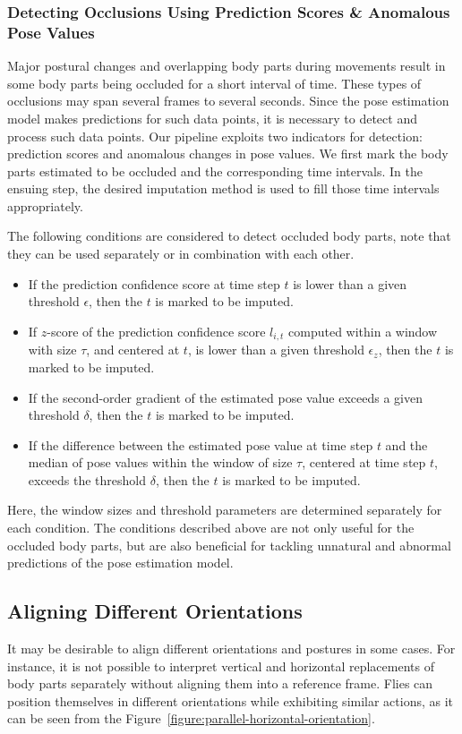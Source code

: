 \subsubsection{Detecting Occlusions Using Prediction Scores \& Anomalous Pose Values}\label{section:detecting-occlusions}
Major postural changes and overlapping body parts during movements result in some body parts being occluded for a short interval of time.
These types of occlusions may span several frames to several seconds.
Since the pose estimation model makes predictions for such data points, it is necessary to detect and process such data points.
Our pipeline exploits two indicators for detection: prediction scores and anomalous changes in pose values.
We first mark the body parts estimated to be occluded and the corresponding time intervals. In the ensuing step, the desired imputation method is used to fill those time intervals appropriately.

The following conditions are considered to detect occluded body parts, note that they can be used separately or in combination with each other.

\begin{itemize}
	\item If the prediction confidence score at time step $t$ is lower than a given threshold $\epsilon$, then the $t$ is marked to be imputed.
	\item If $z$-score of the prediction confidence score $l_{i,t}$ computed within a window with size $\tau$, and centered at $t$, is lower than a given threshold $\epsilon_z$, then the $t$ is marked to be imputed.
	\item If the second-order gradient of the estimated pose value exceeds a given threshold $\delta$, then the $t$ is marked to be imputed.
	\item If the difference between the estimated pose value at time step $t$ and the median of pose values within the window of size $\tau$, centered at time step $t$, exceeds the threshold $\delta$, then the $t$ is marked to be imputed.
\end{itemize}
Here, the window sizes and threshold parameters are determined separately for each condition.
The conditions described above are not only useful for the occluded body parts, but are also beneficial for tackling unnatural and abnormal predictions of the pose estimation model.

\subsection{Aligning Different Orientations}
It may be desirable to align different orientations and postures in some cases.
For instance, it is not possible to interpret vertical and horizontal replacements of body parts separately without aligning them into a reference frame. Flies can position themselves in different orientations while exhibiting similar actions, as it can be seen from the Figure~\ref{figure:parallel-horizontal-orientation}. %


